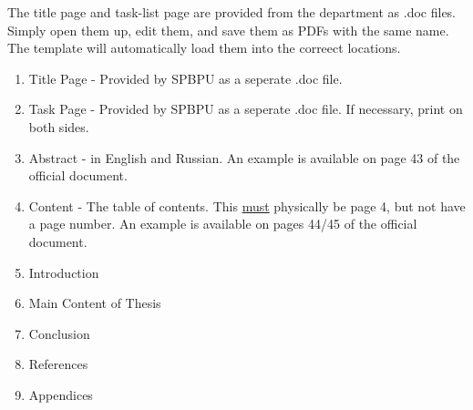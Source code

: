 \label{sec:guidelines_content}
The title page and task-list page are provided from the department as .doc files. Simply open them up, edit them, and save them as PDFs with the same name. The template will automatically load them into the correect locations.

\begin{enumerate}
    \item Title Page - Provided by SPBPU as a seperate .doc file.
    \item Task Page - Provided by SPBPU as a seperate .doc file. If necessary, print on both sides.
    \item Abstract - in English and Russian. An example is available on page 43 of the official document.\cite{Polytech2018}
    \item Content - The table of contents. This \underline{must} physically be page 4, but not have a page number. An example is available on pages 44/45 of the official document.\cite{Polytech2018}
    \item Introduction
    \item Main Content of Thesis
    \item Conclusion
    \item References
    \item Appendices
\end{enumerate}